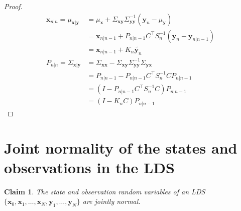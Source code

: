 \documentclass[12pt]{article}
\newtheorem{claim}{Claim}
\begin{document}
\begin{proof}
    \begin{align*}
        \mathbf{x}_{n|n}=\mu_{\mathbf{x}|\mathbf{y}}&=\mu_{\mathbf{x}} + \Sigma_{\mathbf{x}\mathbf{y}}\Sigma_{\mathbf{y}\mathbf{y}}^{-1}(\mathbf{y}_n-\mu_{\mathbf{y}})\\
                                                    &=\mathbf{x}_{n|n-1}+P_{n|n-1}C^\intercal S_n^{-1}(\mathbf{y}_n-\mathbf{y}_{n|n-1})\\
                                                    &=\mathbf{x}_{n|n-1}+K_n\tilde{\mathbf{y}_n}\\
        P_{n|n}=\Sigma_{\mathbf{x}|\mathbf{y}}&=\Sigma_{\mathbf{x}\mathbf{x}}-\Sigma_{\mathbf{x}\mathbf{y}}\Sigma_{\mathbf{y}\mathbf{y}}^{-1}\Sigma_{\mathbf{y}\mathbf{x}}\\
                                              &=P_{n|n-1}-P_{n|n-1}C^\intercal S_n^{-1}CP_{n|n-1}\\
                                              &=(I-P_{n|n-1}C^\intercal S_n^{-1}C)P_{n|n-1}\\
                                              &=(I-K_nC)P_{n|n-1}
    \end{align*}

\end{proof}

\section{Joint normality of the states and observations in the LDS}

\begin{claim}
    The state and observation random variables of an LDS $\{\mathbf{x}_0,
    \mathbf{x}_1, \ldots, \mathbf{x}_N, \mathbf{y}_1, \ldots, \mathbf{y}_N\}$
    are jointly normal.
\end{claim}
\end{document}
